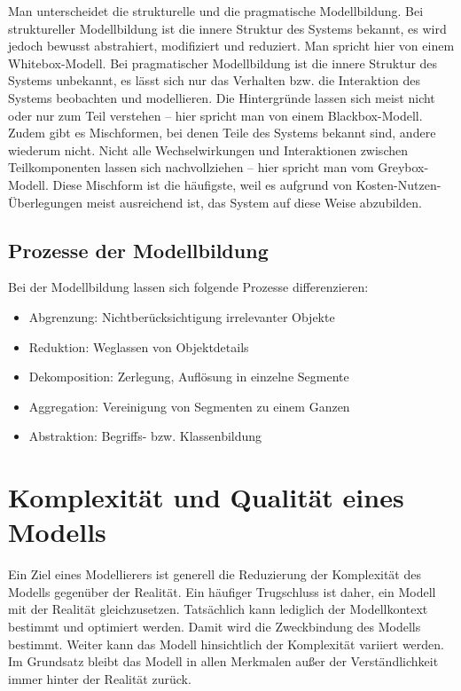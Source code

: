 \documentclass[a4paper, 12pt, pagesize]{scrartcl}
\begin{document}
Man unterscheidet die strukturelle und die pragmatische Modellbildung. Bei struktureller Modellbildung ist die innere Struktur des Systems bekannt, es wird jedoch bewusst abstrahiert, modifiziert und reduziert. Man spricht hier von einem Whitebox-Modell. Bei pragmatischer Modellbildung ist die innere Struktur des Systems unbekannt, es lässt sich nur das Verhalten bzw. die Interaktion des Systems beobachten und modellieren. Die Hintergründe lassen sich meist nicht oder nur zum Teil verstehen – hier spricht man von einem Blackbox-Modell. Zudem gibt es Mischformen, bei denen Teile des Systems bekannt sind, andere wiederum nicht. Nicht alle Wechselwirkungen und Interaktionen zwischen Teilkomponenten lassen sich nachvollziehen – hier spricht man vom Greybox-Modell. Diese Mischform ist die häufigste, weil es aufgrund von Kosten-Nutzen-Überlegungen meist ausreichend ist, das System auf diese Weise abzubilden.

\subsection{Prozesse der Modellbildung}

Bei der Modellbildung lassen sich folgende Prozesse differenzieren:

\begin{itemize}
    \item Abgrenzung: Nichtberücksichtigung irrelevanter Objekte
    \item Reduktion: Weglassen von Objektdetails
    \item Dekomposition: Zerlegung, Auflösung in einzelne Segmente
    \item Aggregation: Vereinigung von Segmenten zu einem Ganzen
    \item Abstraktion: Begriffs- bzw. Klassenbildung
\end{itemize}

\section{Komplexität und Qualität eines Modells}

Ein Ziel eines Modellierers ist generell die Reduzierung der Komplexität des Modells gegenüber der Realität. Ein häufiger Trugschluss ist daher, ein Modell mit der Realität gleichzusetzen. Tatsächlich kann lediglich der Modellkontext bestimmt und optimiert werden. Damit wird die Zweckbindung des Modells bestimmt. Weiter kann das Modell hinsichtlich der Komplexität variiert werden. Im Grundsatz bleibt das Modell in allen Merkmalen außer der Verständlichkeit immer hinter der Realität zurück.
\end{document}
